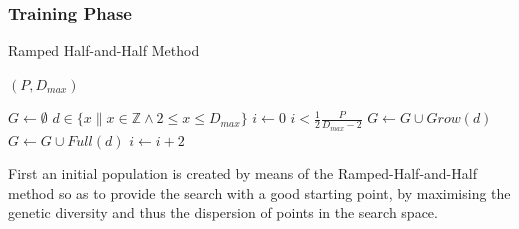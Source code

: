 \documentclass[a4paper,12pt]{article}
\begin{document}
        \subsubsection*{Training Phase}
            \begin{minipage}{.6\linewidth}
                \begin{algorithm}[H]
                    \tiny
                    \caption{Ramped Half-and-Half Method} 
                    \label{alg:rampedhalfandhalf}
                    \SetAlgoLined
                    \CreateInitialPopulation
                    {
                        $(P,D_{max})$}
                    {   
                        
                        $G \gets \emptyset$ \; 
                        \ForEach 
                        {
                            $d \in \{x \| x \in \mathbb{Z} \wedge 2 \leq x \leq D_{max} \}$
                        }
                        {
                            $i \gets 0$ \;
                            \For
                            {
                                $i <\frac{1}{2}\frac{P}{D_{max} - 2}$
                            }
                            {
                                $G \gets G \cup  Grow(d)$ \;
                                $G \gets G \cup  Full(d)$ \;
                                $i \gets i + 2 $\;
                            } 
                        } 
                        \; 
                    } 
                \end{algorithm} 
                \vspace{1cm}
            \end{minipage}
            \begin{minipage}{.4\linewidth}
                \par{
                    First an initial population is created by means of the Ramped-Half-and-Half method so as to provide the search with a good 
                    starting point, by maximising the genetic diversity and thus the dispersion of points in the search space.
                }
                \vspace{1cm}
            \end{minipage}
\end{document}
